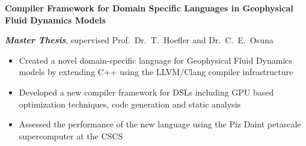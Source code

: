 \textbf{Compiler Framework for Domain Specific Languages in Geophysical Fluid Dynamics Models}

\textbf{\textit{Master Thesis}}, supervised Prof.\ Dr.\ T.\ Hoefler and Dr.\ C.\ E.\ Osuna

\begin{itemize}
	\item Created a novel domain-specific language for Geophysical Fluid Dynamics models by extending C++ using the LLVM/Clang compiler infrastructure
	\item Developed a new compiler framework for DSLs including GPU based optimization techniques, code generation and static analysis
	\item Assessed the performance of the new language using the Piz Daint petascale supercomputer at the CSCS
\end{itemize}
